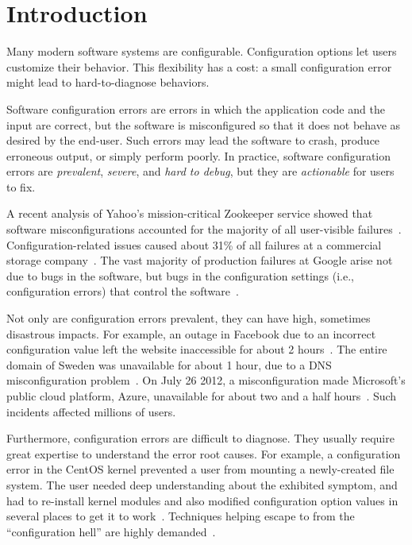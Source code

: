 
\section{Introduction}
\label{sec:introduction}

Many modern software systems are configurable.
Configuration options let users
customize their behavior. This flexibility has a cost:
a small configuration error might lead to hard-to-diagnose
behaviors.

Software configuration errors are errors in which
the application code and the input are correct, but the software is
misconfigured so that it does not behave
as desired by the end-user. Such errors may lead
the software to crash,
produce erroneous output, or simply perform poorly.
In practice, software configuration
errors are \textit{prevalent}, \textit{severe}, and
\textit{hard to debug}, but they are \textit{actionable} for users to fix.


A recent analysis of Yahoo's mission-critical Zookeeper service
showed that software misconfigurations accounted for
the majority of all user-visible failures~\cite{bft}.
Configuration-related issues caused about 31\% of all
failures at a commercial storage company~\cite{Yin:2011:ESC}.
The vast majority of production failures at Google
arise not due to bugs in the software, but bugs in the
configuration settings (i.e., configuration errors)
that control the software~\cite{googleconf}.

Not only are configuration errors prevalent, they
can have high, sometimes disastrous impacts. For example,
an outage in Facebook due to
an incorrect configuration value left the website 
inaccessible for about 2 hours~\cite{fbout}. 
The entire  domain of Sweden was unavailable
for about 1 hour, due to a DNS misconfiguration problem~\cite{sedown}.
On July 26 2012, 
a misconfiguration made 
Microsoft's public cloud platform, Azure,
unavailable for about two and a half hours~\cite{msdown}.
Such incidents affected millions of users.

Furthermore, configuration errors are difficult to diagnose. 
They usually require great expertise to understand
the error root causes. For example, a
configuration error in the CentOS kernel prevented
a user from mounting a newly-created file system.
The user needed deep understanding about the
exhibited symptom,  and had to re-install kernel modules and
also modified configuration option values in
several places to get it to work~\cite{Yin:2011:ESC}.
Techniques helping escape to from the ``configuration hell''
are highly demanded~\cite{googleconf}.

